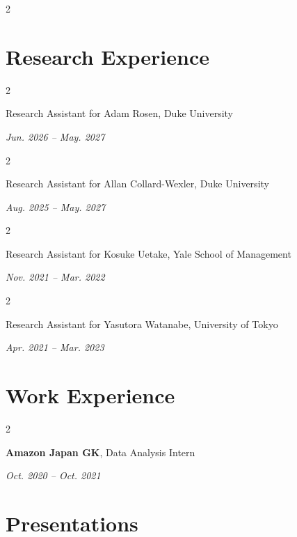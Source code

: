 \documentclass[11pt, letterpaper]{article}
\newenvironment{twocolentry}[2][]{
    \onecolentry
    \def\secondColumn{#2}
    \setcolumnwidth{\fill, 4.5 cm}
    \begin{paracol}{2}
}{
    \switchcolumn \raggedleft \secondColumn
    \end{paracol}
    \endonecolentry
} %
\begin{document}
    \begin{twocolentry}{
                
            }
            
    \end{twocolentry}
    \vspace{0.2cm}
    
    
    \section{Research Experience}

    
    
    \begin{twocolentry}{\textit{Jun. 2026 – May. 2027}}
        Research Assistant for Adam Rosen, Duke University
    \end{twocolentry}
    \vspace{0.2cm}

    \begin{twocolentry}{\textit{Aug. 2025 – May. 2027}}
        Research Assistant for Allan Collard-Wexler, Duke University
    \end{twocolentry}
    \vspace{0.2cm}
    
    \begin{twocolentry}{\textit{Nov. 2021 – Mar. 2022}}
        Research Assistant for Kosuke Uetake, Yale School of Management
    \end{twocolentry}
    \vspace{0.2cm}

    \begin{twocolentry}{\textit{Apr. 2021 – Mar. 2023}}
        Research Assistant for Yasutora Watanabe, University of Tokyo
    \end{twocolentry}
    \vspace{0.2cm}
    


        \section{Work Experience}
    \begin{twocolentry}{\textit{Oct. 2020 – Oct. 2021}}
            {\bf Amazon Japan GK}, Data Analysis Intern
    \end{twocolentry}
    \vspace{0.2cm}

    \section{Presentations}
\end{document}
